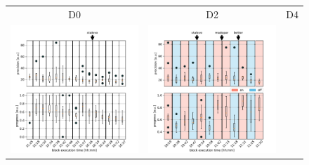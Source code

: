 \documentclass[10pt,a4paper]{article}
\begin{document}
\begin{figure}
\centering
\begin{tabular}{ccc}
	D0 & D2  & D4 \\
	\includegraphics[width=\behwidth\textwidth]{figures/behavioral/d0_stats_scores_copyDraw}&
	\includegraphics[width=\behwidth\textwidth]{figures/behavioral/d2_stats_scores_copyDraw}&

\end{tabular}
\end{figure}
\end{document}
